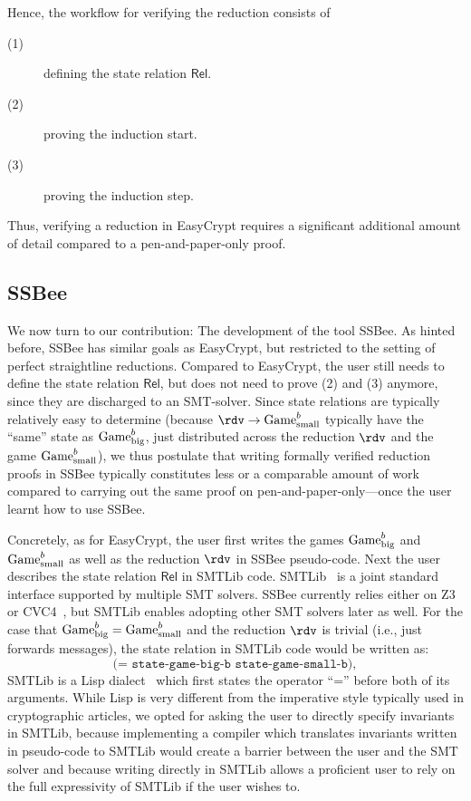 Hence, the workflow for verifying the reduction consists of
\begin{description}
\item[(1)] defining the state relation $\mathsf{Rel}$.
\item[(2)] proving the induction start.
\item[(3)] proving the induction step.
\end{description}
Thus, verifying a reduction in EasyCrypt requires a significant additional amount of detail
compared to a pen-and-paper-only proof.


\subsection{SSBee}\label{sec:ssbee}
We now turn to our contribution: The development of the tool SSBee. As hinted before, SSBee
has similar goals as EasyCrypt, but restricted to the setting of perfect straightline
reductions. Compared to EasyCrypt, the user still needs to define the state relation $\mathsf{Rel}$, but does not need to prove (2) and (3) anymore, since they are discharged to an SMT-solver.
Since state relations are typically relatively easy to determine (because $\rdv\rightarrow\M{Game}_\text{small}^b$ typically have the ``same'' state as $\text{\textrm{\upshape Game}}_\text{big}^b$, just distributed across the reduction $\rdv$ and the game $\text{\textrm{\upshape Game}}_\text{small}^b$), we thus postulate that writing formally verified reduction proofs in SSBee typically constitutes less or a comparable amount of work compared to carrying out the same proof on pen-and-paper-only---once the user learnt how to use SSBee.

Concretely, as for EasyCrypt, the user first writes the games $\text{\textrm{\upshape Game}}_\text{big}^b$ and $\text{\textrm{\upshape Game}}_\text{small}^b$ as well as the reduction $\rdv$ in SSBee pseudo-code. Next the user describes the state relation $\mathsf{Rel}$ in SMTLib code. SMTLib~\cite{X} is a joint standard interface supported by multiple SMT solvers. SSBee currently relies either on Z3~\cite{X} or CVC4~\cite{X}, but SMTLib enables adopting other SMT solvers later as well. For the case that $\text{\textrm{\upshape Game}}_\text{big}^b=\text{\textrm{\upshape Game}}_\text{small}^b$ and the reduction $\rdv$ is trivial (i.e., just forwards messages), the state relation in SMTLib code would be written as:
\[\texttt{(= state-game-big-b state-game-small-b)},\]
SMTLib is a Lisp dialect~\cite{X} which first states the operator ``='' before both of its arguments.
While Lisp is very different from the imperative style typically used in cryptographic articles,
we opted for asking the user to directly specify invariants in SMTLib, because implementing a compiler
which translates invariants written in pseudo-code to SMTLib would create a barrier between the user and the SMT solver and because writing directly in SMTLib allows a proficient user to rely on the full expressivity of SMTLib if the user wishes to.

